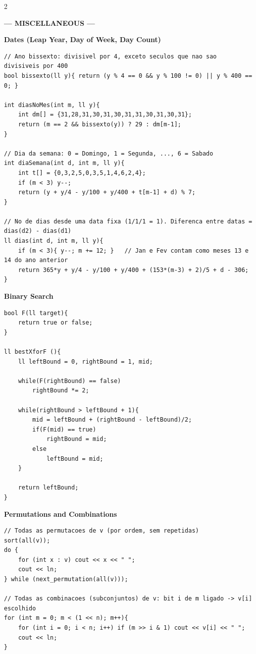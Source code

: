 \documentclass{article}
\begin{document}
\begin{multicols}{2}
\large
\begin{center}
\huge\textbf{--- MISCELLANEOUS ---}
\end{center}
\large

\large
\Large\textbf{Dates (Leap Year, Day of Week, Day Count)}
\large
\begin{lstlisting}
// Ano bissexto: divisivel por 4, exceto seculos que nao sao divisiveis por 400
bool bissexto(ll y){ return (y % 4 == 0 && y % 100 != 0) || y % 400 == 0; }

int diasNoMes(int m, ll y){
	int dm[] = {31,28,31,30,31,30,31,31,30,31,30,31};
	return (m == 2 && bissexto(y)) ? 29 : dm[m-1];
}

// Dia da semana: 0 = Domingo, 1 = Segunda, ..., 6 = Sabado
int diaSemana(int d, int m, ll y){
	int t[] = {0,3,2,5,0,3,5,1,4,6,2,4};
	if (m < 3) y--;
	return (y + y/4 - y/100 + y/400 + t[m-1] + d) % 7;
}

// No de dias desde uma data fixa (1/1/1 = 1). Diferenca entre datas = dias(d2) - dias(d1)
ll dias(int d, int m, ll y){
	if (m < 3){ y--; m += 12; }   // Jan e Fev contam como meses 13 e 14 do ano anterior
	return 365*y + y/4 - y/100 + y/400 + (153*(m-3) + 2)/5 + d - 306;
}
\end{lstlisting}

\large
\Large\textbf{Binary Search}
\large
\begin{lstlisting}
bool F(ll target){
    return true or false;
}

ll bestXforF (){
    ll leftBound = 0, rightBound = 1, mid;
    
    while(F(rightBound) == false)
        rightBound *= 2;

    while(rightBound > leftBound + 1){
        mid = leftBound + (rightBound - leftBound)/2;
        if(F(mid) == true)
            rightBound = mid;
        else    
            leftBound = mid;
    }

    return leftBound;
}
\end{lstlisting}


\large
\Large\textbf{Permutations and Combinations}
\large
\begin{lstlisting}
// Todas as permutacoes de v (por ordem, sem repetidas)
sort(all(v));
do {
	for (int x : v) cout << x << " ";
	cout << ln;
} while (next_permutation(all(v)));

// Todas as combinacoes (subconjuntos) de v: bit i de m ligado -> v[i] escolhido
for (int m = 0; m < (1 << n); m++){
	for (int i = 0; i < n; i++) if (m >> i & 1) cout << v[i] << " ";
	cout << ln;
}


\end{lstlisting}
\end{multicols}
\end{document}
